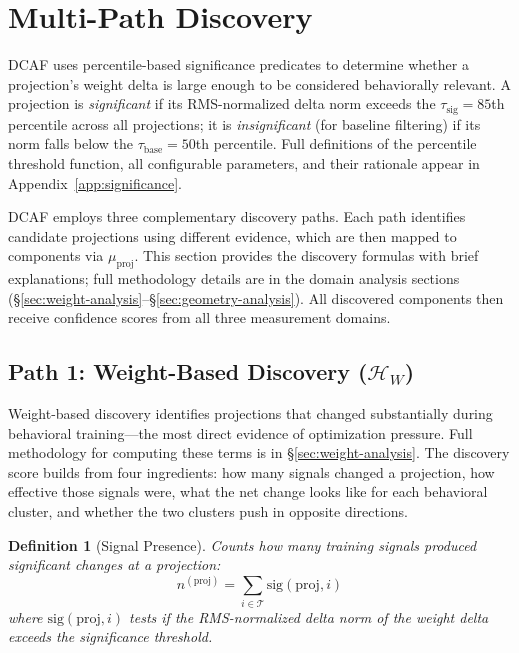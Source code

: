 \documentclass[11pt]{article}
\newtheorem{definition}{Definition}[section]
\begin{document}
\section{Multi-Path Discovery}
\label{sec:multi-path-discovery}

DCAF uses percentile-based significance predicates to determine whether a projection's weight delta is large enough to be considered behaviorally relevant. A projection is \emph{significant} if its RMS-normalized delta norm exceeds the $\tau_{\text{sig}} = 85$th percentile across all projections; it is \emph{insignificant} (for baseline filtering) if its norm falls below the $\tau_{\text{base}} = 50$th percentile. Full definitions of the percentile threshold function, all configurable parameters, and their rationale appear in Appendix~\ref{app:significance}.

DCAF employs three complementary discovery paths. Each path identifies candidate projections using different evidence, which are then mapped to components via $\mu_{\text{proj}}$. This section provides the discovery formulas with brief explanations; full methodology details are in the domain analysis sections (\S\ref{sec:weight-analysis}--\S\ref{sec:geometry-analysis}). All discovered components then receive confidence scores from all three measurement domains.

\subsection{Path 1: Weight-Based Discovery ($\mathcal{H}_W$)}
\label{sec:weight-discovery}

Weight-based discovery identifies projections that changed substantially during behavioral training---the most direct evidence of optimization pressure. Full methodology for computing these terms is in \S\ref{sec:weight-analysis}. The discovery score builds from four ingredients: how many signals changed a projection, how effective those signals were, what the net change looks like for each behavioral cluster, and whether the two clusters push in opposite directions.

\begin{definition}[Signal Presence]
\label{def:signal-presence}
Counts how many training signals produced significant changes at a projection:
\begin{equation}
n^{(\text{proj})} = \sum_{i \in \mathcal{T}} \text{sig}(\text{proj}, i)
\end{equation}
where $\text{sig}(\text{proj}, i)$ tests if the RMS-normalized delta norm of the weight delta exceeds the significance threshold.
\end{definition}
\end{document}
